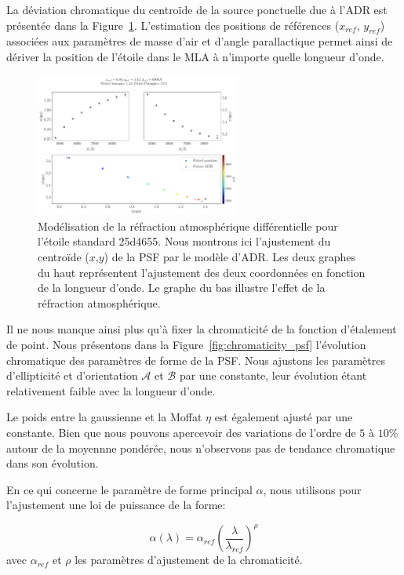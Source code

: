 \documentclass[../main/main.tex]{subfiles}
\begin{document}
La déviation chromatique du centroïde de la source ponctuelle due à
l'ADR est présentée dans la Figure~\ref{fig:adr_std}. L'estimation des
positions de références ($x_{ref}$, $y_{ref}$) associées aux 
paramètres de masse d'air et d'angle parallactique permet ainsi de
dériver la position de l'étoile dans le MLA à n'importe quelle longueur d'onde.

\begin{figure}
  \centering
  \includegraphics[width=0.6\textwidth]{../figures/06_irf/adr_std.pdf}
  \caption[Modélisation de la réfraction atmosphérique
  différentielle]{Modélisation de la réfraction atmosphérique
    différentielle pour l'étoile standard 25d4655. Nous montrons ici
    l'ajustement du centroïde ($x$,$y$) de la PSF par le modèle
    d'ADR. Les deux graphes du haut représentent l'ajustement des deux
    coordonnées en fonction de la longueur d'onde. Le graphe du bas
    illustre l'effet de la réfraction atmosphérique.}
  \label{fig:adr_std}
\end{figure}

Il ne nous manque ainsi plus qu'à fixer la chromaticité de la fonction
d'étalement de point.
Nous présentons dans la Figure~\ref{fig:chromaticity_psf} l'évolution
chromatique des paramètres de forme de la PSF. Nous ajustons les
paramètres d'ellipticité et d'orientation $\mathcal{A}$ et $\mathcal{B}$
par une constante, leur évolution étant relativement faible avec la longueur d'onde.

Le poids entre la gaussienne et la Moffat $\eta$ est également ajusté
par une constante. Bien que nous pouvons apercevoir des variations de
l'ordre de $5$ à $10\%$ autour de la moyennne pondérée, nous n'observons pas
de tendance chromatique dans son évolution.

En ce qui concerne le paramètre de forme principal $\alpha$, nous
utilisons pour l'ajustement une loi de puissance de la forme:

\begin{equation}
  \label{eq:alphachrom}
  \alpha(\lambda)=\alpha_{ref}\left(\frac{\lambda}{\lambda_{ref}}\right)^{\rho}
\end{equation}
avec $\alpha_{ref}$ et $\rho$ les paramètres d'ajustement de la chromaticité.
\end{document}
